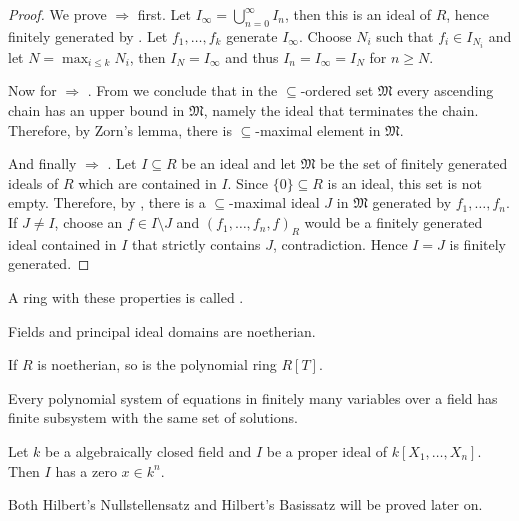 \documentclass[a4paper,parskip=half,numbers=enddot, DIV=12]{scrreprt}
\renewcommand{\geq}{\geqslant}
\renewcommand{\leq}{\leqslant}
\begin{document}
	\begin{proof}
		We prove  $\Rightarrow$  first. Let $I_\infty = \bigcup_{n=0}^\infty I_n$, then this is an ideal of $R$, hence finitely generated by . Let $f_1,\ldots, f_k$ generate $I_\infty$. Choose $N_i$ such that $f_i\in I_{N_i}$ and let $N = \max_{i\leq k}N_i$, then $I_N = I_\infty$ and thus $I_n=I_\infty=I_N$ for $n\geq N$.
		
		Now for  $\Rightarrow$ . From  we conclude that in the $\subseteq$-ordered set $\mathfrak{M}$ every ascending chain has an upper bound in $\mathfrak{M}$, namely the ideal that terminates the chain. Therefore, by Zorn's lemma, there is $\subseteq$-maximal element in $\mathfrak{M}$.
		
		And finally  $\Rightarrow$ . Let $I\subseteq R$ be an ideal and let $\mathfrak{M}$ be the set of finitely generated ideals of $R$ which are contained in $I$. Since $\{0\}\subseteq R$ is an ideal, this set is not empty. Therefore, by , there is a $\subseteq$-maximal ideal $J$ in $\mathfrak{M}$ generated by $f_1,\ldots, f_n$. If $J\neq I$, choose an $f\in I\setminus J$ and $(f_1,\ldots,f_n,f)_R$ would be a finitely generated ideal contained in $I$ that strictly contains $J$, contradiction. Hence $I=J$ is finitely generated.
	\end{proof}
	
	\begin{defi}
		A ring with these properties is called .
	\end{defi}
	\begin{example}
		Fields and principal ideal domains are noetherian. 
	\end{example}
	\begin{thm}
		If $R$ is noetherian, so is the polynomial ring $R[T]$.
	\end{thm}
	\begin{cor}
		Every polynomial system of equations in finitely many variables over a field has finite subsystem with the same set of solutions.
	\end{cor}
	\begin{thm} 
		Let $k$ be a algebraically closed field and $I$ be a proper ideal of $k[X_1,\ldots,X_n]$. Then $I$ has a zero $x\in k^n$.
	\end{thm}
	Both Hilbert's Nullstellensatz and Hilbert's Basissatz will be proved later on.
\end{document}
